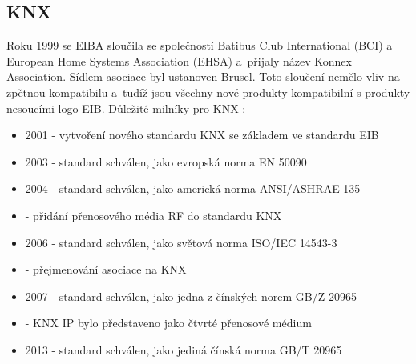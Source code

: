\subsection{KNX}
Roku 1999 se EIBA sloučila se společností Batibus Club International (BCI) a European Home Systems Association (EHSA) a~přijaly název Konnex Association. Sídlem asociace byl ustanoven Brusel. Toto sloučení nemělo vliv na zpětnou kompatibilu a~tudíž jsou všechny nové produkty kompatibilní s produkty nesoucími logo EIB. Důležité milníky pro KNX \cite{KNX  history}:
\begin{itemize}
\item 2001 - vytvoření nového standardu KNX se základem ve standardu EIB
\item 2003 - standard schválen, jako evropská norma  EN 50090
\item 2004 - standard schválen, jako americká norma  ANSI/ASHRAE 135
\item[] \hspace{0.821cm} - přidání přenosového média RF do standardu KNX
\item 2006 - standard schválen, jako světová norma  ISO/IEC 14543-3
\item[] \hspace{0.821cm} - přejmenování asociace na KNX
\item 2007 - standard schválen, jako jedna z čínských norem GB/Z 20965
\item[] \hspace{0.821cm} - KNX IP bylo představeno jako čtvrté přenosové médium
\item 2013 - standard schválen, jako jediná čínská norma GB/T 20965
\end{itemize}

